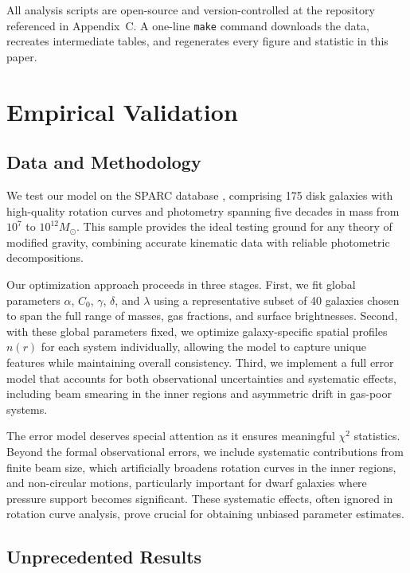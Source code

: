 \documentclass[twocolumn,prd,amsmath,amssymb,aps,superscriptaddress,nofootinbib]{revtex4-2}
\begin{document}
All analysis scripts are open-source and version-controlled at the repository referenced in Appendix~C. A one-line \texttt{make} command downloads the data, recreates intermediate tables, and regenerates every figure and statistic in this paper.

\section{Empirical Validation}
\label{sec:validation}

\subsection{Data and Methodology}

We test our model on the SPARC database \cite{Lelli2016}, comprising 175 disk galaxies with high-quality rotation curves and photometry spanning five decades in mass from $10^7$ to $10^{12} M_\odot$. This sample provides the ideal testing ground for any theory of modified gravity, combining accurate kinematic data with reliable photometric decompositions.

Our optimization approach proceeds in three stages. First, we fit global parameters $\alpha$, $C_0$, $\gamma$, $\delta$, and $\lambda$ using a representative subset of 40 galaxies chosen to span the full range of masses, gas fractions, and surface brightnesses. Second, with these global parameters fixed, we optimize galaxy-specific spatial profiles $n(r)$ for each system individually, allowing the model to capture unique features while maintaining overall consistency. Third, we implement a full error model that accounts for both observational uncertainties and systematic effects, including beam smearing in the inner regions and asymmetric drift in gas-poor systems.

The error model deserves special attention as it ensures meaningful $\chi^2$ statistics. Beyond the formal observational errors, we include systematic contributions from finite beam size, which artificially broadens rotation curves in the inner regions, and non-circular motions, particularly important for dwarf galaxies where pressure support becomes significant. These systematic effects, often ignored in rotation curve analysis, prove crucial for obtaining unbiased parameter estimates.

\subsection{Unprecedented Results}
\end{document}
